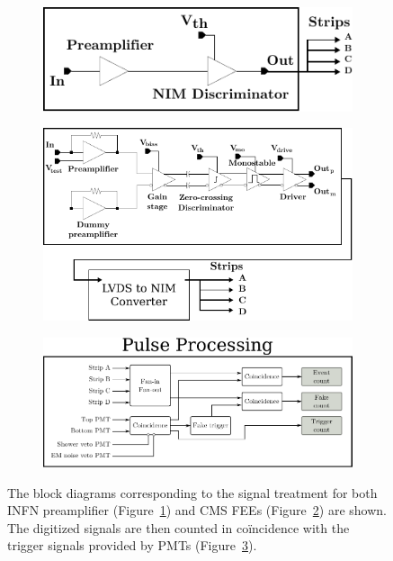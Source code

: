 	\begin{figure}[H]
		\begin{subfigure}{.5\linewidth}
		    \centering
			\includegraphics[width = 0.9\linewidth]{fig/chapt6/atlas-block-diagram-2013.pdf}
			\caption{\label{fig:Pulse-Processing:A}}
		\end{subfigure}
		\begin{subfigure}{.5\linewidth}
		    \centering
			\includegraphics[width = 0.9\linewidth]{fig/chapt6/cms-block-diagram-2013.pdf}
			\caption{\label{fig:Pulse-Processing:B}}
		\end{subfigure}
		\begin{subfigure}{\linewidth}
		    \centering
			\includegraphics[width = 0.8\linewidth]{fig/chapt6/pulse-processing-2013.pdf}
			\caption{\label{fig:Pulse-Processing:C}}
		\end{subfigure}
		\caption{\label{fig:Pulse-Processing} The block diagrams corresponding to the signal treatment for both INFN preamplifier (Figure~\ref{fig:Pulse-Processing:A}) and CMS FEEs (Figure~\ref{fig:Pulse-Processing:B}) are shown. The digitized signals are then counted in coïncidence with the trigger signals provided by PMTs (Figure~\ref{fig:Pulse-Processing:C}).}
    \end{figure}
    

